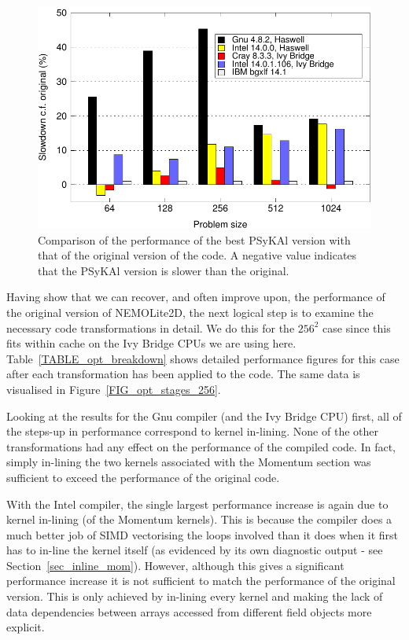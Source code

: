 \documentclass[gmd, manuscript]{copernicus}
\newlength{\picwidth}
\begin{document}
\begin{figure}[!t]
\centering
\includegraphics[width=\picwidth]{slowdown_summary}
\caption{Comparison of the performance of the best {PS}y{KA}l
version with that of the original version of the code. A negative value 
indicates that the {PS}y{KA}l version is slower than the original.}
\label{FIG_slowdown_summary}
\end{figure}

Having show that we can recover, and often improve upon, the
performance of the original version of NEMOLite2D, the next logical
step is to examine the necessary code transformations in detail.  We
do this for the $256^{2}$ case since this fits within cache on the Ivy
Bridge CPUs we are using here.  Table~\ref{TABLE_opt_breakdown} shows
detailed performance figures for this case after each transformation
has been applied to the code. The same data is visualised in
Figure~\ref{FIG_opt_stages_256}.

Looking at the results for the Gnu compiler (and the Ivy Bridge CPU)
first, all of the steps-up in performance correspond to kernel
in-lining. None of the other transformations had any effect on the
performance of the compiled code. In fact, simply in-lining the two
kernels associated with the Momentum section was sufficient to exceed
the performance of the original code.

With the Intel compiler, the single largest performance increase is
again due to kernel in-lining (of the Momentum kernels). This is
because the compiler does a much better job of SIMD vectorising the
loops involved than it does when it first has to in-line the kernel
itself (as evidenced by its own diagnostic output - see
Section~\ref{sec_inline_mom}). However, although this gives a
significant performance increase it is not sufficient to match the
performance of the original version. This is only achieved by
in-lining every kernel and making the lack of data dependencies
between arrays accessed from different field objects more explicit.
\end{document}
